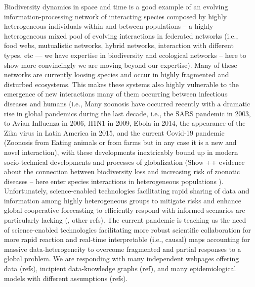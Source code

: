 \documentclass[11pt, a4paper]{article} %
\begin{document}
Biodiversity dynamics in space and time is a good example of an
evolving information-processing network of interacting species
composed by highly heterogeneous individuals within and between
populations -- a highly heterogeneous mixed pool of evolving
interactions in federated networks (i.e., food webs, mutualistic
networks, hybrid networks, interaction with different types, etc ---
we have expertise in biodiversity and ecological networks -- here to
show more convincingly we are moving beyond our expertise). Many of
these networks are currently loosing species and occur in highly
fragmented and disturbed ecosystems. This makes these systems also
highly vulnerable to the emergence of new interactions many of them
occurring between infectious diseases and humans (i.e., Many zoonosis
have occurred recently with a dramatic rise in global pandemics during
the last decade, i.e., the SARS pandemic in 2003, to Avian Influenza
in 2006, H1N1 in 2009, Ebola in 2014, the appearance of the Zika virus
in Latin America in 2015, and the current Covid-19 pandemic (Zoonosis
from Eating animals or from farms but in any case it is a new and
novel interaction), with these developments inextricably bound up in
modern socio-technical developments and processes of globalization
(Show ++ evidence about the connection between biodiversity loss and
increasing risk of zoonotic diseases -- here enter species
interactions in heterogeneous populations ). Unfortunately,
science-enabled technologies facilitating rapid sharing of data and
information among highly heterogeneous groups to mitigate risks and
enhance global cooperative forecasting to efficiently respond with
informed scenarios are particularly lacking (\citep{Wilson2018}, other
refs). The current pandemic is teaching us the need of science-enabled
technologies facilitating more robust scientific collaboration for
more rapid reaction and real-time interpretable (i.e., causal) maps
accounting for massive data-heterogeneity to overcome fragmented and
partial responses to a global problem. We are responding with many
independent webpages offering data (refs), incipient data-knowledge
graphs (ref), and many epidemiological models with different
assumptions (refs).
\end{document}
